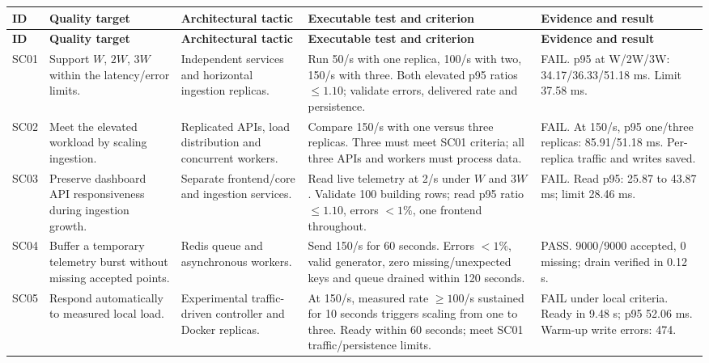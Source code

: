 \documentclass[12pt, a4paper]{article}
\begin{document}
\renewcommand{\arraystretch}{1.3}
\begin{longtable}{|p{}|p{}|p{}|p{}|p{}|}
\hline
\textbf{ID} & \textbf{Quality target} & \textbf{Architectural tactic} & \textbf{Executable test and criterion} & \textbf{Evidence and result} \\ \hline
\endfirsthead
\hline
\textbf{ID} & \textbf{Quality target} & \textbf{Architectural tactic} & \textbf{Executable test and criterion} & \textbf{Evidence and result} \\ \hline
\endhead
SC01 & Support $W$, $2W$, $3W$ within the latency/error limits. & Independent services and horizontal ingestion replicas. & Run 50/s with one replica, 100/s with two, 150/s with three. Both elevated p95 ratios $\leq1.10$; validate errors, delivered rate and persistence. & FAIL. p95 at W/2W/3W: 34.17/36.33/51.18 ms. Limit 37.58 ms. \\ \hline
SC02 & Meet the elevated workload by scaling ingestion. & Replicated APIs, load distribution and concurrent workers. & Compare 150/s with one versus three replicas. Three must meet SC01 criteria; all three APIs and workers must process data. & FAIL. At 150/s, p95 one/three replicas: 85.91/51.18 ms. Per-replica traffic and writes saved. \\ \hline
SC03 & Preserve dashboard API responsiveness during ingestion growth. & Separate frontend/core and ingestion services. & Read live telemetry at 2/s under $W$ and $3W$. Validate 100 building rows; read p95 ratio $\leq1.10$, errors $<1\%$, one frontend throughout. & FAIL. Read p95: 25.87 to 43.87 ms; limit 28.46 ms. \\ \hline
SC04 & Buffer a temporary telemetry burst without missing accepted points. & Redis queue and asynchronous workers. & Send 150/s for 60 seconds. Errors $<1\%$, valid generator, zero missing/unexpected keys and queue drained within 120 seconds. & PASS. 9000/9000 accepted, 0 missing; drain verified in 0.12 s. \\ \hline
SC05 & Respond automatically to measured local load. & Experimental traffic-driven controller and Docker replicas. & At 150/s, measured rate $\geq100$/s sustained for 10 seconds triggers scaling from one to three. Ready within 60 seconds; meet SC01 traffic/persistence limits. & FAIL under local criteria. Ready in 9.48 s; p95 52.06 ms. Warm-up write errors: 474. \\ \hline
\end{longtable}
\end{document}
